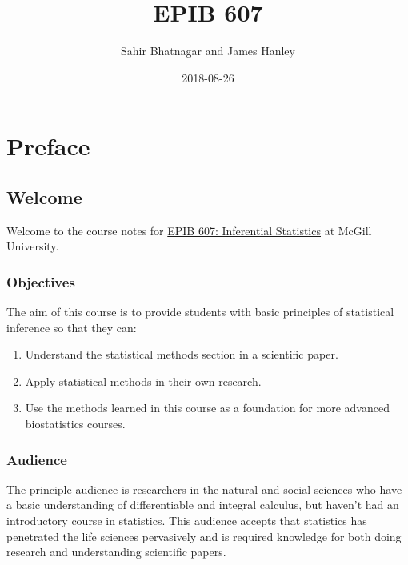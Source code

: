 \documentclass[]{book}
\title{EPIB 607}
\author{Sahir Bhatnagar and James Hanley}
\date{2018-08-26}
\providecommand{\tightlist}{%
  \setlength{\itemsep}{0pt}\setlength{\parskip}{0pt}}
\providecommand{\tightlist}{%
  \setlength{\itemsep}{0pt}\setlength{\parskip}{0pt}}
\theoremstyle{definition}
\theoremstyle{definition}
\theoremstyle{definition}
\theoremstyle{remark}
\begin{document}
\maketitle

{
\setcounter{tocdepth}{1}
\tableofcontents
}
\part{Preface}\label{part-preface}

\chapter*{Welcome}\label{welcome}

Welcome to the course notes for
\href{https://www.mcgill.ca/study/2018-2019/courses/epib-607}{EPIB 607:
Inferential Statistics} at McGill University.

\section*{Objectives}\label{objectives}

The aim of this course is to provide students with basic principles of
statistical inference so that they can:

\begin{enumerate}
\def\labelenumi{\arabic{enumi}.}
\tightlist
\item
  Understand the statistical methods section in a scientific paper.\\
\item
  Apply statistical methods in their own research.\\
\item
  Use the methods learned in this course as a foundation for more
  advanced biostatistics courses.
\end{enumerate}

\section*{Audience}\label{audience}

The principle audience is researchers in the natural and social sciences
who have a basic understanding of differentiable and integral calculus,
but haven't had an introductory course in statistics. This audience
accepts that statistics has penetrated the life sciences pervasively and
is required knowledge for both doing research and understanding
scientific papers.
\end{document}
